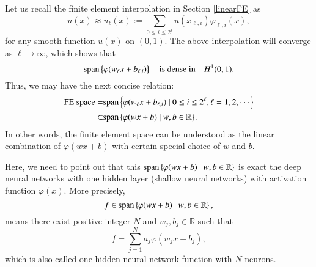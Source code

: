 Let us recall the finite element interpolation in Section \ref{linearFE} as
\begin{equation}\label{key}
u(x) \approx u_\ell(x) := \sum_{ 0\le i \le 2^\ell} u(x_{\ell,i}) \varphi_{\ell,i}(x),
\end{equation}
for any smooth function $u(x)$ on $(0,1)$. The above interpolation will converge as $\ell \to \infty$, which shows that
\begin{equation}\label{key}
{\rm span} \left\{  \varphi(w_\ell x + b_{\ell,i}) \right\} \quad \text{is dense in} \quad H^1(0,1).
\end{equation}
Thus, we may have the next concise relation:
\begin{equation}\label{key}
\begin{split}
\text{FE space} =  &{\rm span} \left\{  \varphi(w_\ell x + b_{\ell,i}) ~|~ 0\le i \le 2^\ell, \ell = 1, 2, \cdots \right\} 
\\
\subset  &{\rm span} \left\{  \varphi(w x + b) ~|~  w, b \in \mathbb{R} \right\}.
\end{split}
\end{equation}
In other words, the finite element space can be understood as the linear combination of $\varphi(w x + b)$ with certain special choice of $w$ and $b$. 

Here, we need to point out that this ${\rm span} \left\{  \varphi(w x + b) ~|~  w, b \in \mathbb{R} \right\}$ is exact the deep neural networks with one hidden layer (shallow neural networks) with activation function $\varphi(x)$. More precisely, 
\begin{equation}\label{key}
f \in {\rm span} \left\{  \varphi(w x + b) ~|~  w, b \in \mathbb{R} \right\},
\end{equation}
means there exist positive integer $N$ and $w_j, b_j \in \mathbb{R}$ such that 
\begin{equation}\label{key}
f = \sum_{j=1}^N a_j \varphi(w_j x + b_j),
\end{equation}
which is also called one hidden neural network function with $N$ neurons.

